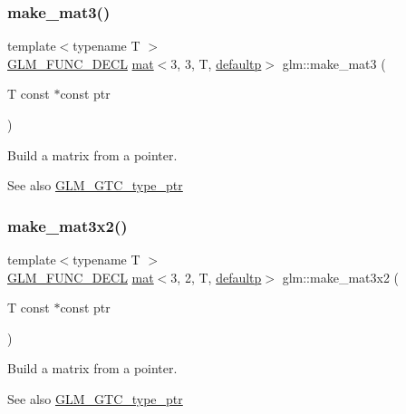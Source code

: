 \subsubsection{\texorpdfstring{make\+\_\+mat3()}{make\_mat3()}}
{\footnotesize\ttfamily template$<$typename T $>$ \\
\mbox{\hyperlink{setup_8hpp_ab2d052de21a70539923e9bcbf6e83a51}{G\+L\+M\+\_\+\+F\+U\+N\+C\+\_\+\+D\+E\+CL}} \mbox{\hyperlink{structglm_1_1mat}{mat}}$<$3, 3, T, \mbox{\hyperlink{namespaceglm_a36ed105b07c7746804d7fdc7cc90ff25a9d21ccd8b5a009ec7eb7677befc3bf51}{defaultp}}$>$ glm\+::make\+\_\+mat3 (\begin{DoxyParamCaption}\item[{T const $\ast$const}]{ptr }\end{DoxyParamCaption})}

Build a matrix from a pointer. \begin{DoxySeeAlso}{See also}
\mbox{\hyperlink{group__gtc__type__ptr}{G\+L\+M\+\_\+\+G\+T\+C\+\_\+type\+\_\+ptr}} 
\end{DoxySeeAlso}
\mbox{\label{group__gtc__type__ptr_ga27a24e121dc39e6857620e0f85b6e1a8}} 
\subsubsection{\texorpdfstring{make\+\_\+mat3x2()}{make\_mat3x2()}}
{\footnotesize\ttfamily template$<$typename T $>$ \\
\mbox{\hyperlink{setup_8hpp_ab2d052de21a70539923e9bcbf6e83a51}{G\+L\+M\+\_\+\+F\+U\+N\+C\+\_\+\+D\+E\+CL}} \mbox{\hyperlink{structglm_1_1mat}{mat}}$<$3, 2, T, \mbox{\hyperlink{namespaceglm_a36ed105b07c7746804d7fdc7cc90ff25a9d21ccd8b5a009ec7eb7677befc3bf51}{defaultp}}$>$ glm\+::make\+\_\+mat3x2 (\begin{DoxyParamCaption}\item[{T const $\ast$const}]{ptr }\end{DoxyParamCaption})}

Build a matrix from a pointer. \begin{DoxySeeAlso}{See also}
\mbox{\hyperlink{group__gtc__type__ptr}{G\+L\+M\+\_\+\+G\+T\+C\+\_\+type\+\_\+ptr}} 
\end{DoxySeeAlso}
\mbox{\label{group__gtc__type__ptr_gaf2e8337b15c3362aaeb6e5849e1c0536}} 
